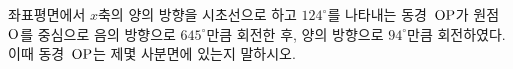 좌표평면에서 $x$축의 양의 방향을 시초선으로 하고 $124^\circ$를 나타내는 동경~$\mathrm{OP}$가 원점~$\mathrm{O}$를 중심으로 음의 방향으로 $645^\circ$만큼 회전한 후, 양의 방향으로 $94^\circ$만큼 회전하였다. 이때 동경~$\mathrm{OP}$는 제몇 사분면에 있는지 말하시오.
